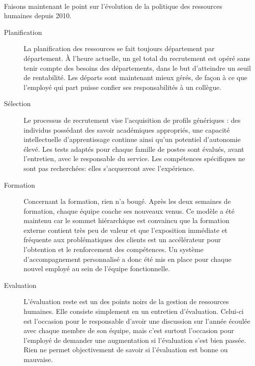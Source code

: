\paragraph{}Faisons maintenant le point sur l'évolution de la politique des ressources humaines depuis 2010. 

\begin{description}
  \item[Planification] La planification des ressources se fait toujours département par département. À l'heure actuelle, un gel total du recrutement est opéré sans tenir compte des besoins des départements, dans le but d'atteindre un seuil de rentabilité. Les départs sont maintenant mieux gérés, de façon à ce que l'employé qui part puisse confier ses responsabilités à un collègue.
  \item[Sélection] Le processus de recrutement vise l’acquisition de profils génériques : des individus possédant des savoir académiques appropriés, une capacité intellectuelle d’apprentissage continue ainsi qu'un potentiel d’autonomie élevé. Les tests adaptés pour chaque famille de postes sont évalués, avant l'entretien, avec le responsable du service. Les compétences spécifiques ne sont pas recherchées: elles s'acquerront avec l'expérience. 
  
  \item[Formation] Concernant la formation, rien n'a bougé. Après les deux semaines de formation, chaque équipe coache ses nouveaux venus. Ce modèle a été maintenu car le sommet hiérarchique est convaincu que la formation externe contient très peu de valeur et que l’exposition immédiate et fréquente aux problématiques des clients est un accélérateur pour l’obtention et le renforcement des compétences. Un système d’accompagnement personnalisé a donc été mis en place pour chaque nouvel employé au sein de l'équipe fonctionnelle. 
  \item[Evaluation] L'évaluation reste est un des points noirs de la gestion de ressources humaines. Elle consiste simplement en un entretien d'évaluation. Celui-ci est l'occasion pour le responsable d'avoir une discussion sur l'année écoulée avec chaque membre de son équipe, mais c'est surtout l'occasion pour l'employé de demander une augmentation si l'évaluation s'est bien passée. Rien ne permet objectivement de savoir si l'évaluation est bonne ou mauvaise. 
  

\end{description}
